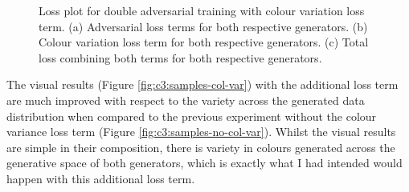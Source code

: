   \begin{figure}[!htbp]
    \centering
    \hfill
    \hfill
    \caption[Loss plot for double adversarial training with colour variation loss term]{Loss plot for double adversarial training with colour variation loss term. (a) Adversarial loss terms for both respective generators. (b) Colour variation loss term for both respective generators. (c) Total loss combining both terms for both respective generators. }
    \label{fig:c3:col-var-losses}
  \end{figure}

\FloatBarrier

The visual results (Figure \ref{fig:c3:samples-col-var}) with the additional loss term are  much improved with respect to the variety across the generated data distribution  when compared to the previous experiment without the colour variance loss term (Figure \ref{fig:c3:samples-no-col-var}).
Whilst the visual results are simple in their composition, there is variety in colours generated across the generative space of both generators, which is exactly what I had intended would happen with this additional loss term. 

